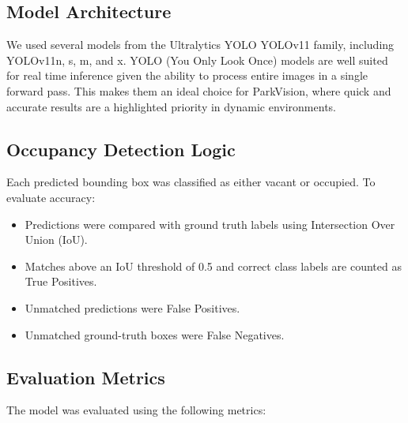 \documentclass[12pt, letterpaper, oneside]{article}
\begin{document}
  
\subsection{Model Architecture}

We used several models from the Ultralytics YOLO YOLOv11 family, including YOLOv11n, s, m, and x. YOLO (You Only Look Once) models are well suited for real time inference given the ability to process entire images in a single forward pass. This makes them an ideal choice for ParkVision, where quick and accurate results are a highlighted priority in dynamic environments.

\subsection{Occupancy Detection Logic}

Each predicted bounding box was classified as either vacant or occupied. To evaluate accuracy:

\begin{itemize}
    \item Predictions were compared with ground truth labels using Intersection Over Union (IoU).

    \item Matches above an IoU threshold of 0.5 and correct class labels are counted as True Positives.

    \item Unmatched predictions were False Positives.

    \item Unmatched ground-truth boxes were False Negatives.

\end{itemize}

\subsection{Evaluation Metrics}
The model was evaluated using the following metrics:
\end{document}
